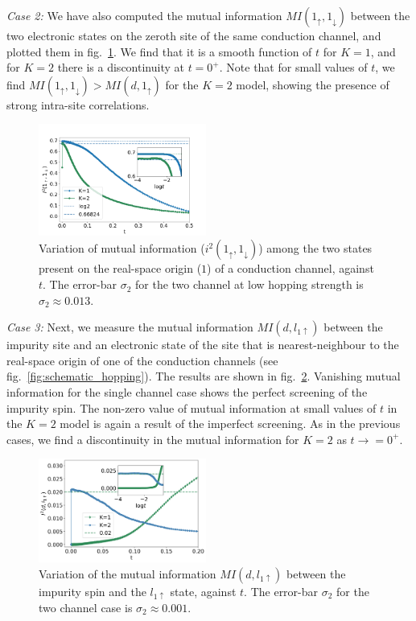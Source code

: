 \documentclass[reprint,prb,superscriptaddress]{revtex4-2}
\begin{document}
\par\textit{Case 2:} We have also computed the mutual information $MI(1_{\uparrow},1_{\downarrow})$  between the two electronic states on the zeroth site of the same conduction channel, and plotted them in fig.~\ref{fig:MI_1_2_vs_t_K}. We find that it is a smooth function of $t$ for \(K=1\), and for \(K=2\) there is a discontinuity at $t=0^{+}$. Note that for small values of \(t\), we find  $MI(1_{\uparrow},1_{\downarrow})>MI(d,1_{\uparrow})$ for the \(K=2\) model, showing the presence of strong intra-site correlations.

\begin{figure}[!htpb]
\includegraphics[width=0.49\textwidth]{AI2ch121up1down}
\caption{Variation of mutual information ($i^2(1_{\uparrow},1_{\downarrow})$) among the two states present on the real-space origin ($1$) of a conduction channel, against $t$. The error-bar $\sigma_2$ for the two channel at low hopping strength is $\sigma_2\approx 0.013$.}
\label{fig:MI_1_2_vs_t_K}
\end{figure}

\par \textit{Case 3:} Next, we measure the mutual information $MI(d,l_{1\uparrow})$ between the impurity site and an electronic state of the site that is nearest-neighbour to the real-space origin of one of the conduction channels (see fig.~\ref{fig:schematic_hopping}).  The results are shown in fig.~\ref{fig:MI_d_l1}. Vanishing mutual information for the single channel case shows the perfect screening of the impurity spin. The non-zero value of mutual information at small values of $t$ in the \(K=2\) model is again a result of the imperfect screening. As in the previous cases, we find a discontinuity in the mutual information for \(K=2\) as $t \to =0^+$.

\begin{figure}
\includegraphics[width=0.49\textwidth]{AI2ch12dl1up}
\caption{Variation of the mutual information $MI(d,l_{1\uparrow})$ between the impurity spin and the $l_{1\uparrow}$ state, against $t$. The error-bar $\sigma_2$ for the two channel case is $\sigma_2\approx 0.001$.}
\label{fig:MI_d_l1}
\end{figure}
\end{document}

